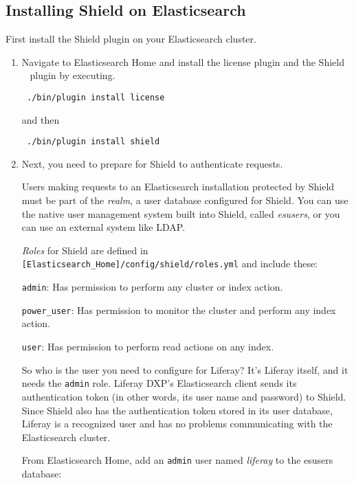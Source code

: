 \subsection{Installing Shield on
Elasticsearch}\label{installing-shield-on-elasticsearch}

First install the Shield plugin on your Elasticsearch cluster.

\begin{enumerate}
\def\labelenumi{\arabic{enumi}.}
\item
  Navigate to Elasticsearch Home and install the license plugin and the
  Shield ~ plugin by executing.

\begin{verbatim}
 ./bin/plugin install license
\end{verbatim}

  and then

\begin{verbatim}
 ./bin/plugin install shield
\end{verbatim}
\item
  Next, you need to prepare for Shield to authenticate requests.

  Users making requests to an Elasticsearch installation protected by
  Shield must be part of the \emph{realm}, a user database configured
  for Shield. You can use the native user management system built into
  Shield, called \emph{esusers}, or you can use an external system like
  LDAP.

  \emph{Roles} for Shield are defined in
  \texttt{{[}Elasticsearch\_Home{]}/config/shield/roles.yml} and include
  these:

  \texttt{admin}: Has permission to perform any cluster or index action.

  \texttt{power\_user}: Has permission to monitor the cluster and
  perform any index action.

  \texttt{user}: Has permission to perform read actions on any index.

  So who is the user you need to configure for Liferay? It's Liferay
  itself, and it needs the \texttt{admin} role. Liferay DXP's
  Elasticsearch client sends its authentication token (in other words,
  its user name and password) to Shield. Since Shield also has the
  authentication token stored in its user database, Liferay is a
  recognized user and has no problems communicating with the
  Elasticsearch cluster.

  From Elasticsearch Home, add an \texttt{admin} user named
  \emph{liferay} to the esusers database:


\end{enumerate}
